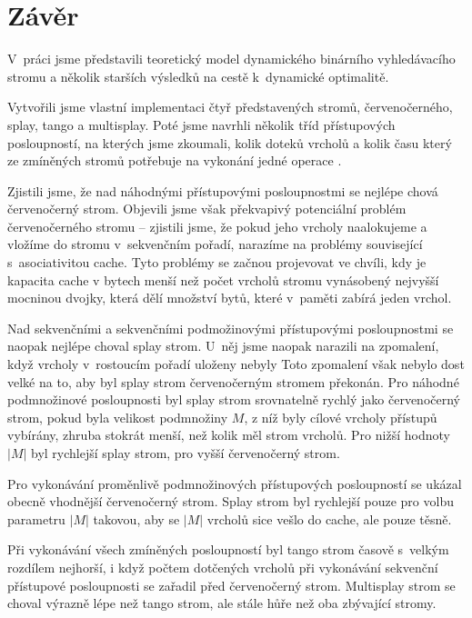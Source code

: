 \chapter*{Závěr}

V~práci jsme představili teoretický model dynamického binárního vyhledávacího stromu a několik starších výsledků na cestě k~dynamické optimalitě.

Vytvořili jsme vlastní implementaci čtyř představených stromů, červenočerného, splay, tango a multisplay. Poté jsme navrhli několik tříd přístupových posloupností, na kterých jsme zkoumali, kolik doteků vrcholů a kolik času který ze zmíněných stromů potřebuje na vykonání jedné operace . 

Zjistili jsme, že nad náhodnými přístupovými posloupnostmi se nejlépe chová
červenočerný strom. Objevili jsme však překvapivý potenciální problém
červenočerného stromu -- zjistili jsme, že pokud jeho vrcholy naalokujeme a
vložíme do stromu v~sekvenčním pořadí, narazíme na problémy související
s~asociativitou cache. Tyto problémy se začnou projevovat ve chvíli, kdy je kapacita cache v bytech menší než počet vrcholů stromu
vynásobený nejvyšší mocninou dvojky, která dělí množství bytů, které v~paměti
zabírá jeden vrchol.

Nad sekvenčními a sekvenčními podmožinovými přístupovými posloupnostmi se
naopak nejlépe choval splay strom. U~něj jsme naopak narazili na zpomalení,
když vrcholy v~rostoucím pořadí uloženy nebyly Toto zpomalení však nebylo dost
velké na to, aby byl splay strom červenočerným stromem překonán. Pro náhodné
podmnožinové posloupnosti byl splay strom srovnatelně rychlý jako červenočerný
strom, pokud byla velikost podmnožiny $M$, z níž byly cílové vrcholy přístupů vybírány, zhruba stokrát menší, než kolik měl strom vrcholů. Pro nižší hodnoty $|M|$ byl rychlejší splay strom,
pro vyšší červenočerný strom. 

Pro vykonávání proměnlivě podmnožinových přístupových posloupností se ukázal
obecně vhodnější červenočerný strom. Splay strom byl rychlejší pouze pro volbu
parametru $|M|$ takovou, aby se $|M|$ vrcholů sice vešlo do cache, ale pouze těsně.

Při vykonávání všech zmíněných posloupností byl tango strom časově s~velkým
rozdílem nejhorší, i když počtem dotčených vrcholů při vykonávání sekvenční
přístupové posloupnosti se zařadil před červenočerný strom. Multisplay strom se
choval výrazně lépe než tango strom, ale stále hůře než oba zbývající stromy.

